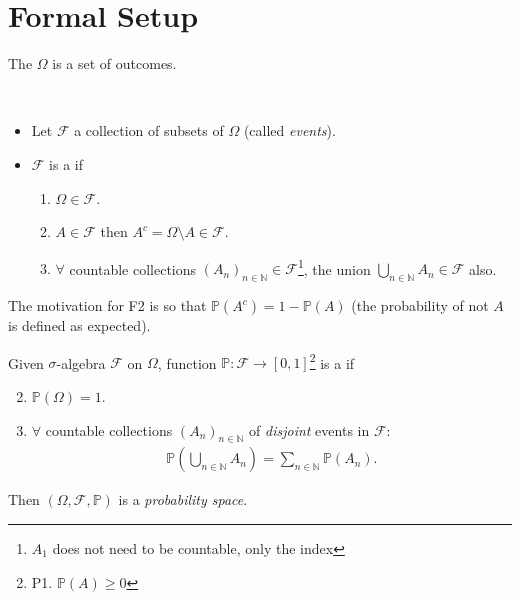 \section{Formal Setup}

\begin{definition}
    The  $\Omega$ is a set of outcomes.
\end{definition}

\begin{definition} ~\vspace*{-1.5\baselineskip}
    \begin{itemize}
        \item Let $\mathcal{F}$ a collection of subsets of $\Omega$ (called \emph{events}).
        \item $\mathcal{F}$ is a  if
        \begin{enumerate}[label=F\arabic*.]
            \item $\Omega\in \mathcal{F}$.
            \item $A\in\mathcal F$ then $A^c = \Omega \setminus A \in\mathcal F$.
            \item $\forall$ countable collections $(A_n)_{n\in\mathbb{N}}\in\mathcal F$\footnote{$A_1$ does not need to be countable, only the index}, the union $\bigcup_{n\in\mathbb{N}} A_n \in \mathcal F$ also.
        \end{enumerate}
    \end{itemize}
\end{definition}

\begin{remark}
    The motivation for F2 is so that $\mathbb{P}(A^c) = 1 - \mathbb{P}(A)$ (the probability of not $A$ is defined as expected).
\end{remark}

\begin{definition}
    Given $\sigma$-algebra $\mathcal{F}$ on $\Omega$, function $\mathbb{P}:\mathcal F \to [0,1]$\footnote{P1. $\mathbb{P}(A) \geq 0$} is a  if
    \begin{enumerate}[label=P\arabic*.] \setcounter{enumi}{1}
        \item $\mathbb{P}(\Omega)=1$.
        \item $\forall$ countable collections $(A_n)_{n \in \mathbb{N}}$ of \emph{disjoint} events in $\mathcal{F}$:
        \begin{align*}
            \mathbb{P}\left( \bigcup_{n\in\mathbb{N}} A_n \right) = \sum_{n\in\mathbb{N}}\mathbb{P}(A_n).
        \end{align*}
    \end{enumerate}
    Then $(\Omega, \mathcal F,\mathbb{P})$ is a \emph{probability space}.
\end{definition}

